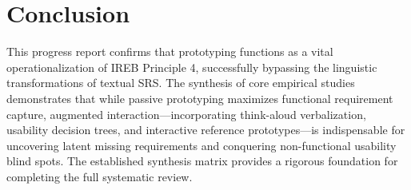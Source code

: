 \documentclass[conference]{IEEEtran}
\begin{document}
\section{Conclusion}
This progress report confirms that prototyping functions as a vital operationalization of IREB Principle 4, successfully bypassing the linguistic transformations of textual SRS. The synthesis of core empirical studies demonstrates that while passive prototyping maximizes functional requirement capture, augmented interaction—incorporating think-aloud verbalization, usability decision trees, and interactive reference prototypes—is indispensable for uncovering latent missing requirements and conquering non-functional usability blind spots. The established synthesis matrix provides a rigorous foundation for completing the full systematic review.



\end{document}
